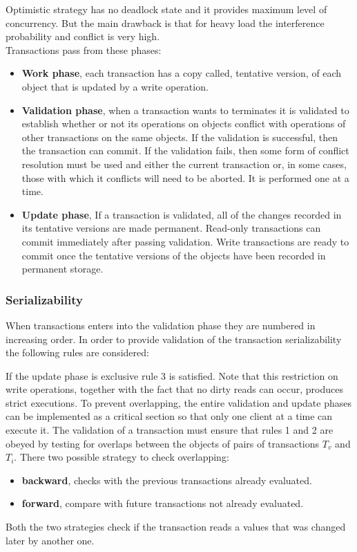 Optimistic strategy has no deadlock state and it provides maximum level of concurrency. But the main drawback is that for heavy load the interference probability and conflict is very high.\\

Transactions pass from these phases:
\begin{itemize}
	\item \textbf{Work phase}, each transaction has a copy called, tentative version, of each object that is updated by a write operation.
	
	\item \textbf{Validation phase}, when a transaction wants to terminates it is validated to establish whether or not its operations on objects conflict with operations of other transactions on the same objects. If the validation is successful, then the transaction can commit. If the validation fails, then some form of conflict resolution must be used and either the current transaction or, in some cases, those with which it conflicts will need to be aborted. It is performed one at a time.
	
	\item \textbf{Update phase}, If a transaction is validated, all of the changes recorded in its tentative versions are made permanent. Read-only transactions can commit immediately after passing validation. Write transactions are ready to commit once the tentative versions of the objects have been recorded in permanent storage.
\end{itemize}

\subsubsection{Serializability}
When transactions enters into the validation phase they are numbered in increasing order. In order to provide validation of the transaction serializability  the following rules are considered:

If the update phase is exclusive rule 3 is satisfied. Note that this restriction on write operations, together with the fact that no dirty reads can occur, produces strict executions. To prevent overlapping, the entire validation and update phases can be implemented as a critical section so that only one client at a time can execute it. The validation of a transaction must ensure that rules 1 and 2 are obeyed by testing for overlaps between the objects of pairs of transactions $T_v$ and $T_i$.
There two possible strategy to check overlapping:
\begin{itemize}
	\item \textbf{backward}, checks with the previous transactions already evaluated.
	\item \textbf{forward}, compare with future transactions not already evaluated.
\end{itemize}
Both the two strategies check if the transaction reads a values that was changed later by another one.

